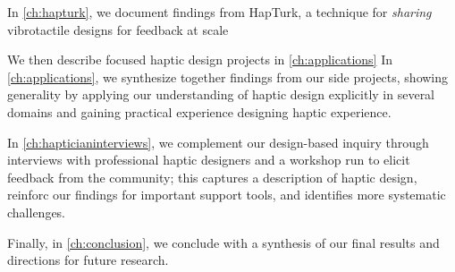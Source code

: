 In \autoref{ch:hapturk}, we document findings from HapTurk, a technique for \emph{sharing} vibrotactile designs for feedback at scale

We then describe focused haptic design projects in \autoref{ch:applications} %
In \autoref{ch:applications}, we synthesize together findings from our side projects, showing generality by applying our understanding of haptic design explicitly in several domains and gaining practical experience designing haptic experience.

In \autoref{ch:hapticianinterviews}, we complement our design-based inquiry through interviews with professional haptic designers and a workshop run to elicit feedback from the community; this captures a description of haptic design, reinforc our findings for important support tools, and identifies more systematic challenges.

Finally, in \autoref{ch:conclusion}, we conclude with a synthesis of our final results and directions for future research.


%
%
\endinput

Any text after an \endinput is ignored.
You could put scraps here or things in progress.
